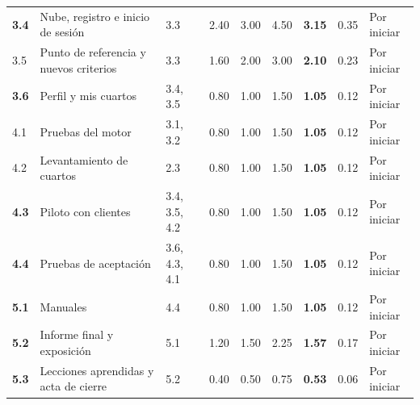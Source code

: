 \documentclass[11pt,a4paper]{article}
\begin{document}
{\begin{longtable}{@{}P{0.75cm} >{\raggedright\arraybackslash}p{4.3cm} P{1.95cm} Q{0.85cm} Q{0.85cm} Q{0.85cm} Q{0.95cm} Q{0.85cm} C{1.75cm}@{}}
\textbf{3.4} & Nube, registro e inicio de sesión & 3.3 & 2.40 & 3.00 & 4.50 & \textbf{3.15} & 0.35 & Por iniciar \\
3.5 & Punto de referencia y nuevos criterios & 3.3 & 1.60 & 2.00 & 3.00 & \textbf{2.10} & 0.23 & Por iniciar \\
\textbf{3.6} & Perfil y mis cuartos & 3.4, 3.5 & 0.80 & 1.00 & 1.50 & \textbf{1.05} & 0.12 & Por iniciar \\
4.1 & Pruebas del motor & 3.1, 3.2 & 0.80 & 1.00 & 1.50 & \textbf{1.05} & 0.12 & Por iniciar \\
4.2 & Levantamiento de cuartos & 2.3 & 0.80 & 1.00 & 1.50 & \textbf{1.05} & 0.12 & Por iniciar \\
\textbf{4.3} & Piloto con clientes & 3.4, 3.5, 4.2 & 0.80 & 1.00 & 1.50 & \textbf{1.05} & 0.12 & Por iniciar \\
\textbf{4.4} & Pruebas de aceptación & 3.6, 4.3, 4.1 & 0.80 & 1.00 & 1.50 & \textbf{1.05} & 0.12 & Por iniciar \\
\textbf{5.1} & Manuales & 4.4 & 0.80 & 1.00 & 1.50 & \textbf{1.05} & 0.12 & Por iniciar \\
\textbf{5.2} & Informe final y exposición & 5.1 & 1.20 & 1.50 & 2.25 & \textbf{1.57} & 0.17 & Por iniciar \\
\textbf{5.3} & Lecciones aprendidas y acta de cierre & 5.2 & 0.40 & 0.50 & 0.75 & \textbf{0.53} & 0.06 & Por iniciar \\
\end{longtable}
}

\end{document}
